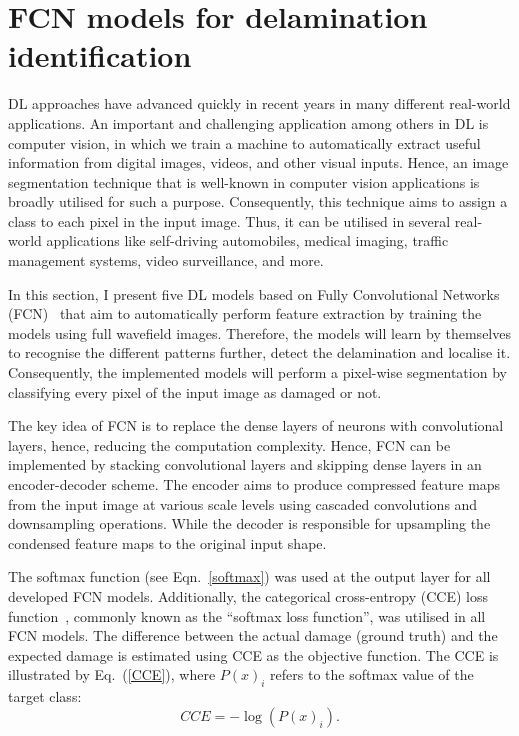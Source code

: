 \section{FCN models for delamination identification}
\label{sec43}
DL approaches have advanced quickly in recent years in many different real-world applications.
An important and challenging application among others in DL is computer vision, in which we train a machine to automatically extract useful information from digital images, videos, and other visual inputs.
Hence, an image segmentation technique that is well-known in computer vision applications is broadly utilised for such a purpose.
Consequently, this technique aims to assign a class to each pixel in the input image.
Thus, it can be utilised in several real-world applications like self-driving automobiles, medical imaging, traffic management systems, video surveillance, and more.

In this section, I present five DL models based on Fully Convolutional Networks (FCN)~\cite{Shelhamer2017} that aim to automatically perform feature extraction by training the models using full wavefield images. 
Therefore, the models will learn by themselves to recognise the different patterns further, detect the delamination and localise it.
Consequently, the implemented models will perform a pixel-wise segmentation by classifying every pixel of the input image as damaged or not.

The key idea of FCN is to replace the dense layers of neurons with convolutional layers, hence, reducing the computation complexity.
Hence, FCN can be implemented by stacking convolutional layers and skipping dense layers in an encoder-decoder scheme.
The encoder aims to produce compressed feature maps from the input image at various scale levels using cascaded convolutions and downsampling operations.
While the decoder is responsible for upsampling the condensed feature maps to the original input shape.

The softmax function (see Eqn.~\ref{softmax}) was used at the output layer for all developed FCN models.
Additionally, the categorical cross-entropy (CCE) loss function~\cite{Bonaccorso2020}, commonly known as the \enquote{softmax loss function}, was utilised in all FCN models.
The difference between the actual damage (ground truth) and the expected damage is estimated using CCE as the objective function.
The CCE is illustrated by Eq.~(\ref{CCE}), where \( P(x)_{i}\) refers to the softmax value of the target class:
\begin{equation}	
	CCE = -\log\left( P(x)_{i} \right).
	\label{CCE}
\end{equation}

